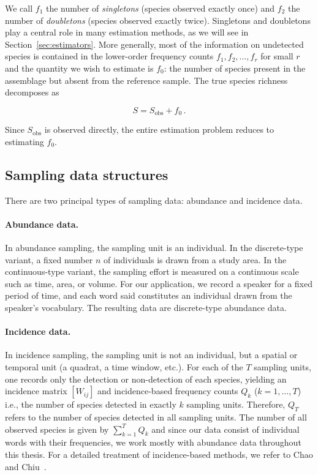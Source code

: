 ﻿\documentclass{article}
\begin{document}
We call $f_1$ the number of \emph{singletons} (species observed exactly once) and $f_2$ the number of \emph{doubletons} (species observed exactly twice). Singletons and doubletons play a central role in many estimation methods, as we will see in Section~\ref{sec:estimators}. More generally, most of the information on undetected species is contained in the lower-order frequency counts $f_1, f_2, \ldots, f_r$ for small $r$ and the quantity we wish to estimate is $f_0$: the number of species present in the assemblage but absent from the reference sample. The true species richness decomposes as

\begin{equation}\label{eq:fundamental}
    S = S_{\mathrm{obs}} + f_0\,.
\end{equation}

Since $S_{\mathrm{obs}}$ is observed directly, the entire estimation 
problem reduces to estimating $f_0$.

\subsection{Sampling data structures}
 
There are two principal types of sampling data: abundance and incidence data.

\paragraph{Abundance data.}
In abundance sampling, the sampling unit is an individual. In the discrete-type variant, a fixed number $n$ of individuals is drawn from a study area. In the continuous-type variant, the sampling effort is measured on a continuous scale such as time, area, or volume. For our application, we record a speaker for a fixed period of time, and each word said constitutes an individual drawn from the speaker's vocabulary. The resulting data are discrete-type abundance data.


\paragraph{Incidence data.}
In incidence sampling, the sampling unit is not an individual, but a spatial or temporal unit (a quadrat, a time window, etc.). For each of the $T$ sampling units, one records only the detection or non-detection of each species, yielding an incidence matrix $[W_{ij}]$ and incidence-based frequency counts $Q_k$ ($k = 1, \ldots, T$) i.e., the number of species detected in exactly $k$ sampling units. Therefore, $Q_T$ refers to the number of species detected in all sampling units. The number of all observed species is given by $\sum_{k=1}^T Q_k$ and since our data consist of individual words with their frequencies, we work mostly with abundance data throughout this thesis. For a detailed treatment of incidence-based methods, we refer to Chao and Chiu~\cite{chao2016species}.
\end{document}

